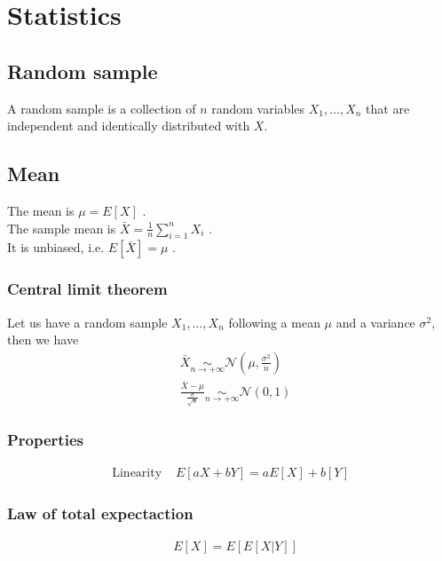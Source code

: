 \documentclass[../main.tex]{subfiles}
\begin{document}
\chapter{Statistics}
\section{Random sample}
A random sample is a collection of $n$ random variables $X_1,\dots, X_n$ that are independent and
identically distributed with $X$.


\section{Mean}
The mean is $\mu = E[X]$ . \\
The sample mean is $\bar{X} = \frac{1}{n} \sum_{i=1}^{n}{X_i}$ . \\
It is unbiased, i.e. $E[\bar{X}] = \mu$ .

\subsection{Central limit theorem}
Let us have a random sample $X_1,\dots, X_n$ following a mean $\mu$ and a variance $\sigma^2$, then we have
\begin{align*}
    &\bar{X} \underset{n \to +\infty}{\sim} \mathcal{N}(\mu, \frac{\sigma^2}{n}) \\
    &\frac{\bar{X} - \mu}{\frac{\sigma}{\sqrt{n}}} \underset{n \to +\infty}{\sim} \mathcal{N}(0, 1)
\end{align*}

\subsection{Properties}
\begin{align*}
    \text{Linearity }&E[aX + bY] = aE[X] + b[Y]
\end{align*}

\subsection{Law of total expectaction}
\begin{align*}
    &E[X] = E[E[X|Y]]
\end{align*}
\end{document}
